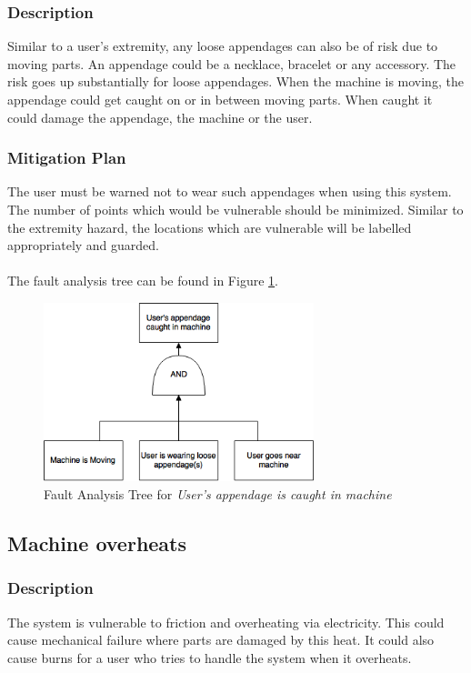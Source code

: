 \documentclass[11pt]{article}
\begin{document}
\subsubsection*{Description}
Similar to a user's extremity, any loose appendages can also be of risk due to moving parts. An appendage could be a necklace, bracelet or any accessory. The risk goes up substantially for loose appendages. When the machine is moving, the appendage could get caught on or in between moving parts. When caught it could damage the appendage, the machine or the user.
\subsubsection*{Mitigation Plan}
The user must be warned not to wear such appendages when using this system. The number of points which would be vulnerable should be minimized. Similar to the extremity hazard, the locations which are vulnerable will be labelled appropriately and guarded. \\ \\

The fault analysis tree can be found in Figure \ref{fig:ft-appendage}.

\begin{figure}[H]
   \centering
   \includegraphics[width=0.7\textwidth]{img/ft-appendage.png} %
   \caption{Fault Analysis Tree for \textit{User's appendage is caught in machine}}
   \label{fig:ft-appendage}
\end{figure}

\subsection{Machine overheats}
\subsubsection*{Description}
The system is vulnerable to friction and overheating via electricity. This could cause mechanical failure where parts are damaged by this heat. It could also cause burns for a user who tries to handle the system when it overheats.
\end{document}
